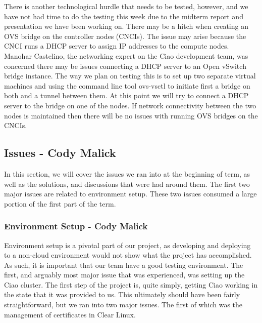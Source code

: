 \documentclass[10pt,onecolumn,journal,draftclsnofoot]{IEEEtran}
\begin{document}
There is another technological hurdle that needs to be tested, however, and we
have not had time to do the testing this week due to the midterm report and
presentation we have been working on. There may be a hitch when creating an OVS
bridge on the controller nodes (CNCIs). The issue may arise because the CNCI
runs a DHCP server to assign IP addresses to the compute nodes. Manohar
Castelino, the networking expert on the Ciao development team, was concerned
there may be issues connecting a DHCP server to an Open vSwitch bridge instance.
The way we plan on testing this is to set up two separate virtual machines and
using the command line tool ovs-vsctl to initiate first a bridge on both and a
tunnel between them. At this point we will try to connect a DHCP server to the
bridge on one of the nodes. If network connectivity between the two nodes is
maintained then there will be no issues with running OVS bridges on the CNCIs.

\subsection{Issues - Cody Malick}
In this section, we will cover the issues we ran into at the beginning of term,
as well as the solutions, and discussions that were had around them. The first
two major issues are related to environment setup. These two issues consumed a
large portion of the first part of the term.

\subsubsection{Environment Setup - Cody Malick}
Environment setup is a pivotal part of our project, as developing and deploying
to a non-cloud environment would not show what the project has accomplished.
As such, it is important that our team have a good testing
environment. The first, and arguably most major issue that was experienced,
was setting up the Ciao cluster. The first step of the project is, quite simply,
getting Ciao working in the state that it was provided to us. This ultimately
should have been fairly straightforward, but we ran into two major issues. 
The first of which was the management of certificates in Clear Linux.
\end{document}
